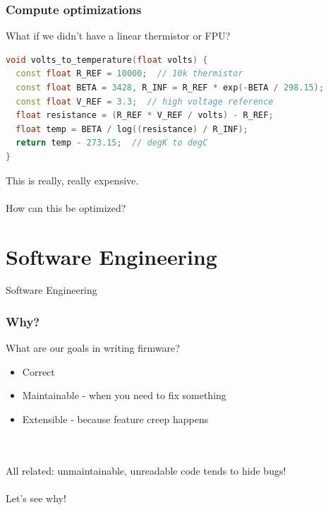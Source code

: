 \documentclass{beamer}
\begin{document}
\begin{frame}[fragile]
\frametitle{Compute optimizations}
What if we didn't have a linear thermistor or FPU?
\begin{lstlisting}[language=C++,basicstyle=\ttfamily\scriptsize]
void volts_to_temperature(float volts) {
  const float R_REF = 10000;  // 10k thermistor
  const float BETA = 3428, R_INF = R_REF * exp(-BETA / 298.15);
  const float V_REF = 3.3;  // high voltage reference
  float resistance = (R_REF * V_REF / volts) - R_REF;
  float temp = BETA / log((resistance) / R_INF);
  return temp - 273.15;  // degK to degC
}
\end{lstlisting}
This is really, really expensive. \\
\hfill \\
How can this be optimized?
\end{frame}

\section{Software Engineering} %
\begin{frame}
\centering \huge Software Engineering
\end{frame}


\begin{frame}
\frametitle{Why?}
What are our goals in writing firmware?

 {
\begin{itemize}
  \item Correct
  \item Maintainable - when you need to fix something
  \item Extensible - because feature creep happens
\end{itemize}
\hfill \\
\hfill \\
All related: unmaintainable, unreadable code tends to hide bugs! \\
\hfill \\
\centering Let's see why!
}
\end{frame}
\end{document}
